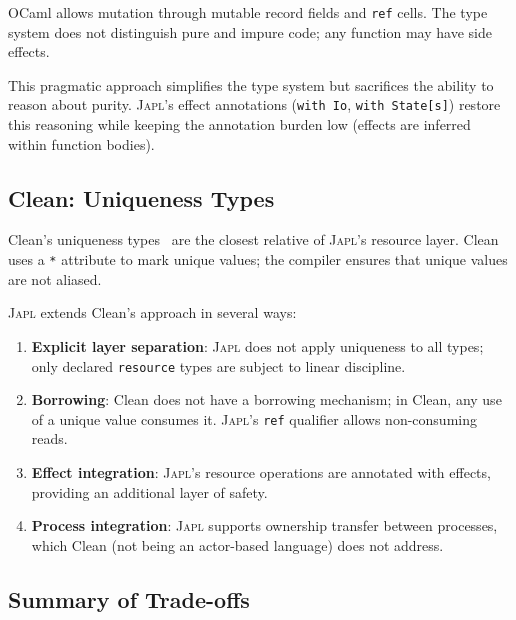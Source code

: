 \documentclass[11pt]{article}
\newcommand{\JAPL}{\textsc{Japl}}
\begin{document}
OCaml allows mutation through mutable record fields and
\texttt{ref} cells.  The type system does not distinguish pure and
impure code; any function may have side effects.

This pragmatic approach simplifies the type system but sacrifices
the ability to reason about purity.  \JAPL{}'s effect annotations
(\texttt{with Io}, \texttt{with State[s]}) restore this reasoning
while keeping the annotation burden low (effects are inferred within
function bodies).

\subsection{Clean: Uniqueness Types}\label{sec:cmp-clean}

Clean's uniqueness types~\cite{barendsen1996uniqueness} are the
closest relative of \JAPL{}'s resource layer.  Clean uses a
\texttt{*} attribute to mark unique values; the compiler ensures
that unique values are not aliased.

\JAPL{} extends Clean's approach in several ways:

\begin{enumerate}
  \item \textbf{Explicit layer separation}: \JAPL{} does not apply
        uniqueness to all types; only declared \texttt{resource} types
        are subject to linear discipline.
  \item \textbf{Borrowing}: Clean does not have a borrowing mechanism;
        in Clean, any use of a unique value consumes it.  \JAPL{}'s
        \texttt{ref} qualifier allows non-consuming reads.
  \item \textbf{Effect integration}: \JAPL{}'s resource operations
        are annotated with effects, providing an additional layer of
        safety.
  \item \textbf{Process integration}: \JAPL{} supports ownership
        transfer between processes, which Clean (not being an
        actor-based language) does not address.
\end{enumerate}

\subsection{Summary of Trade-offs}
\end{document}
